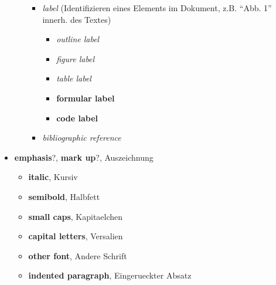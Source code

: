 \begin{itemize}
\begin{itemize}
      \begin{itemize}
      \itemsep1pt\parskip0pt
      \item
        \emph{label} (Identifizieren eines Elements im Dokument, z.B.
        ``Abb. 1'' innerh. des Textes)

        \begin{itemize}
        \itemsep1pt\parskip0pt
        \item
          \emph{outline label}
        \item
          \emph{figure label}
        \item
          \emph{table label}
        \item
          \textbf{formular label}
        \item
          \textbf{code label}
        \end{itemize}
      \item
        \emph{bibliographic reference}
      \end{itemize}
    \end{itemize}
  \item
    \textbf{emphasis}?, \textbf{mark up}?, Auszeichnung

    \begin{itemize}
    \itemsep1pt\parskip0pt
    \item
      \textbf{italic}, Kursiv
    \item
      \textbf{semibold}, Halbfett
    \item
      \textbf{small caps}, Kapitaelchen
    \item
      \textbf{capital letters}, Versalien
    \item
      \textbf{other font}, Andere Schrift
    \item
      \textbf{indented paragraph}, Eingerueckter Absatz
    \end{itemize}
  \end{itemize}